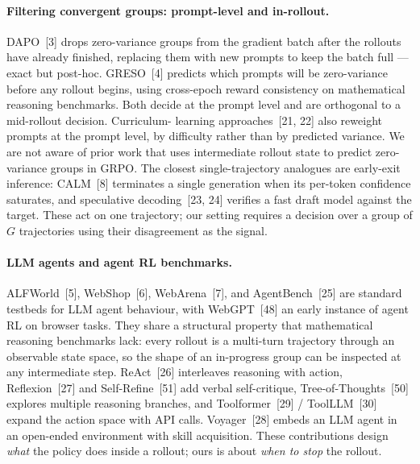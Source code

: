 \documentclass{article}
\begin{document}
\paragraph{Filtering convergent groups: prompt-level and
in-rollout.}
DAPO~[3] drops zero-variance groups from the gradient batch after
the rollouts have already finished, replacing them with new
prompts to keep the batch full --- exact but post-hoc.
GRESO~[4] predicts which prompts will be zero-variance before any
rollout begins, using cross-epoch reward consistency on
mathematical reasoning benchmarks. Both decide at the prompt
level and are orthogonal to a mid-rollout decision. Curriculum-
learning approaches~[21, 22] also reweight prompts at the prompt
level, by difficulty rather than by predicted variance.
We are not aware of prior work that uses intermediate rollout
state to predict zero-variance groups in GRPO. The closest
single-trajectory analogues are early-exit inference: CALM~[8]
terminates a single generation when its per-token confidence
saturates, and speculative decoding~[23, 24] verifies a fast
draft model against the target. These act on one trajectory; our
setting requires a decision over a group of $G$ trajectories
using their disagreement as the signal.

\paragraph{LLM agents and agent RL benchmarks.}
ALFWorld~[5], WebShop~[6], WebArena~[7], and AgentBench~[25] are
standard testbeds for LLM agent behaviour, with
WebGPT~[48] an early instance of agent RL on browser tasks.
They share a structural property that mathematical reasoning
benchmarks lack: every rollout is a multi-turn trajectory
through an observable state space, so the shape of an
in-progress group can be inspected at any intermediate step.
ReAct~[26] interleaves reasoning with action, Reflexion~[27] and
Self-Refine~[51] add verbal self-critique, Tree-of-Thoughts~[50]
explores multiple reasoning branches, and Toolformer~[29] /
ToolLLM~[30] expand the action space with API calls. Voyager~[28]
embeds an LLM agent in an open-ended environment with skill
acquisition. These contributions design \emph{what} the policy
does inside a rollout; ours is about \emph{when to stop} the
rollout.
\end{document}
